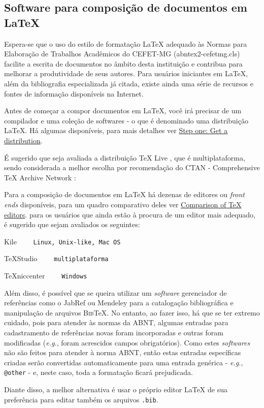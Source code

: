 \begin{apendicesenv}

\chapter{Software para composição de documentos em \LaTeX}
\label{chap:softApoio}

Espera-se que o uso do estilo de formatação \LaTeX{} adequado às Normas para Elaboração de Trabalhos Acadêmicos do CEFET-MG ({\ttfamily abntex2-cefetmg.cls}) facilite a escrita de documentos no âmbito desta instituição e contribua para melhorar a produtividade de seus autores. Para usuários iniciantes em \LaTeX{}, além da bibliografia especializada já citada, existe ainda uma série de recursos \cite{CTAN2014} e fontes de informação \cite{TeX-Br2014,Wikibooks2014} disponíveis na Internet.

Antes de começar a compor documentos em \LaTeX{}, você irá precisar de um compilador e uma coleção de softwares - o que é denominado uma distribuição \LaTeX{}. Há algumas disponíveis, para mais detalhes ver \href{http://www.ctan.org/starter.html}{Step one: Get a distribution}.

É sugerido que seja avaliada a distribuição TeX Live \cite{TeXLive2014}, que é multiplataforma, sendo considerada a melhor escolha por recomendação do CTAN - Comprehensive \TeX{} Archive Network \cite{CTAN2014}:

Para a composição de documentos em \LaTeX{} há dezenas de editores ou \textit{front ends} disponíveis, para um quadro comparativo deles ver \href{http://en.wikipedia.org/wiki/Comparison_of_TeX_editors}{Comparison of TeX editors}. para os usuários que ainda estão à procura de um editor mais adequado, é sugerido que sejam avaliados os seguintes:

\begin{compactitem}
	\item Kile \cite{Kile2014} \ \ \ \  \verb|Linux, Unix-like, Mac OS|
	\item TeXStudio \cite{TeXstudio2014} \ \ \ \  \verb|multiplataforma|
	\item TeXniccenter \cite{TeXnicCenter2014} \ \ \ \  \verb|Windows|
\end{compactitem}


Além disso, é possível que se queira utilizar um \textit{software} gerenciador de referências como o JabRef \cite{JabRef2014} ou Mendeley \cite{Mendeley2014} para a catalogação bibliográfica e manipulação de arquivos \textsc{Bib}\TeX{}. No entanto, ao fazer isso, há que se ter extremo cuidado, pois para atender às normas da ABNT, algumas entradas para cadastramento de referências novas foram incorporadas e outras foram modificadas (\textit{e.g.}, foram acrescidos campos obrigatórios). Como estes \textit{softwares} não são feitos para atender à norma ABNT, então estas entradas específicas criadas serão convertidas automaticamente para uma entrada genérica - \textit{e.g.}, \verb|@other| - e, neste caso, toda a formatação ficará prejudicada.

Diante disso, a melhor alternativa é usar o próprio editor \LaTeX{} de sua preferência para editar também os arquivos \verb|.bib|.


\end{apendicesenv}